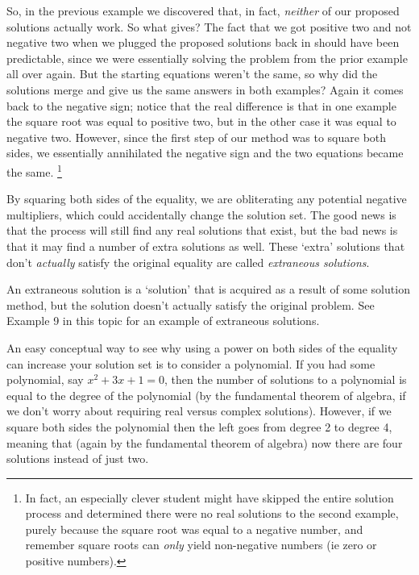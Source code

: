 \documentclass{ximera}
\begin{document}
    So, in the previous example we discovered that, in fact, \textit{neither} of our proposed solutions actually work. So what gives? The fact that we got positive two and not negative two when we plugged the proposed solutions back in should have been predictable, since we were essentially solving the problem from the prior example all over again. But the starting equations weren't the same, so why did the solutions merge and give us the same answers in both examples? Again it comes back to the negative sign; notice that the real difference is that in one example the square root was equal to positive two, but in the other case it was equal to negative two. However, since the first step of our method was to square both sides, we essentially annihilated the negative sign and the two equations became the same.%
    \footnote{%
        In fact, an especially clever student might have skipped the entire solution process and determined there were no real solutions to the second example, purely because the square root was equal to a negative number, and remember square roots can \textit{only} yield non-negative numbers (ie zero or positive numbers).%
        }

    By squaring both sides of the equality, we are obliterating any potential negative multipliers, which could accidentally change the solution set. The good news is that the process will still find any real solutions that exist, but the bad news is that it may find a number of extra solutions as well. These `extra' solutions that don't \textit{actually} satisfy the original equality are called \textit{extraneous solutions}.
    
    \begin{definition}
        An extraneous solution is a `solution' that is acquired as a result of some solution method, but the solution doesn't actually satisfy the original problem. See Example 9 in this topic for an example of extraneous solutions.
    \end{definition}
    
    An easy conceptual way to see why using a power on both sides of the equality can increase your solution set is to consider a polynomial. If you had some polynomial, say $x^2 + 3x + 1 = 0$, then the number of solutions to a polynomial is equal to the degree of the polynomial (by the fundamental theorem of algebra, if we don't worry about requiring real versus complex solutions). However, if we square both sides the polynomial then the left goes from degree 2 to degree 4, meaning that (again by the fundamental theorem of algebra) now there are four solutions instead of just two.
    
\end{document}
